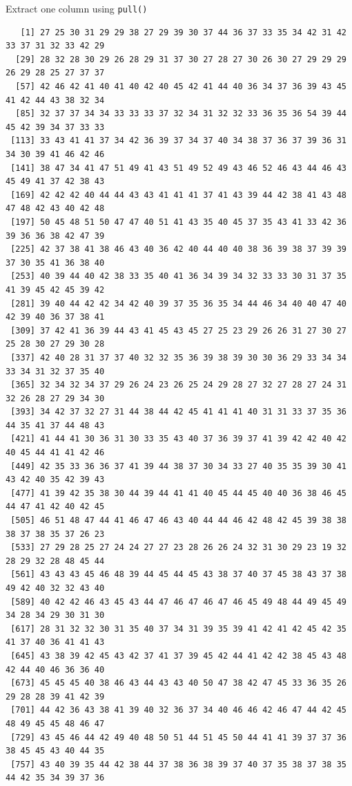 \documentclass[
  ignorenonframetext,
  aspectratio=169,
]{beamer}
\let\oldtexttt\texttt
\renewcommand{\texttt}[1]{\colorbox{gray!20}{\oldtexttt{#1}}}
\begin{document}
\begin{frame}[fragile]{Extract one column using \texttt{pull()}}
\begin{verbatim}
   [1] 27 25 30 31 29 29 38 27 29 39 30 37 44 36 37 33 35 34 42 31 42 33 37 31 32 33 42 29
  [29] 28 32 28 30 29 26 28 29 31 37 30 27 28 27 30 26 30 27 29 29 29 26 29 28 25 27 37 37
  [57] 42 46 42 41 40 41 40 42 40 45 42 41 44 40 36 34 37 36 39 43 45 41 42 44 43 38 32 34
  [85] 32 37 37 34 34 33 33 33 37 32 34 31 32 32 33 36 35 36 54 39 44 45 42 39 34 37 33 33
 [113] 33 43 41 41 37 34 42 36 39 37 34 37 40 34 38 37 36 37 39 36 31 34 30 39 41 46 42 46
 [141] 38 47 34 41 47 51 49 41 43 51 49 52 49 43 46 52 46 43 44 46 43 45 49 41 37 42 38 43
 [169] 42 42 42 40 44 44 43 43 41 41 41 37 41 43 39 44 42 38 41 43 48 47 48 42 43 40 42 48
 [197] 50 45 48 51 50 47 47 40 51 41 43 35 40 45 37 35 43 41 33 42 36 39 36 36 38 42 47 39
 [225] 42 37 38 41 38 46 43 40 36 42 40 44 40 40 38 36 39 38 37 39 39 37 30 35 41 36 38 40
 [253] 40 39 44 40 42 38 33 35 40 41 36 34 39 34 32 33 33 30 31 37 35 41 39 45 42 45 39 42
 [281] 39 40 44 42 42 34 42 40 39 37 35 36 35 34 44 46 34 40 40 47 40 42 39 40 36 37 38 41
 [309] 37 42 41 36 39 44 43 41 45 43 45 27 25 23 29 26 26 31 27 30 27 25 28 30 27 29 30 28
 [337] 42 40 28 31 37 37 40 32 32 35 36 39 38 39 30 30 36 29 33 34 34 33 34 31 32 37 35 40
 [365] 32 34 32 34 37 29 26 24 23 26 25 24 29 28 27 32 27 28 27 24 31 32 26 28 27 29 34 30
 [393] 34 42 37 32 27 31 44 38 44 42 45 41 41 41 40 31 31 33 37 35 36 44 35 41 37 44 48 43
 [421] 41 44 41 30 36 31 30 33 35 43 40 37 36 39 37 41 39 42 42 40 42 40 45 44 41 41 42 46
 [449] 42 35 33 36 36 37 41 39 44 38 37 30 34 33 27 40 35 35 39 30 41 43 42 40 35 42 39 43
 [477] 41 39 42 35 38 30 44 39 44 41 41 40 45 44 45 40 40 36 38 46 45 44 47 41 42 40 42 45
 [505] 46 51 48 47 44 41 46 47 46 43 40 44 44 46 42 48 42 45 39 38 38 38 37 38 35 37 26 23
 [533] 27 29 28 25 27 24 24 27 27 23 28 26 26 24 32 31 30 29 23 19 32 28 29 32 28 48 45 44
 [561] 43 43 43 45 46 48 39 44 45 44 45 43 38 37 40 37 45 38 43 37 38 49 42 40 32 32 43 40
 [589] 40 42 42 46 43 45 43 44 47 46 47 46 47 46 45 49 48 44 49 45 49 34 28 34 29 30 31 30
 [617] 28 31 32 32 30 31 35 40 37 34 31 39 35 39 41 42 41 42 45 42 35 41 37 40 36 41 41 43
 [645] 43 38 39 42 45 43 42 37 41 37 39 45 42 44 41 42 42 38 45 43 48 42 44 40 46 36 36 40
 [673] 45 45 45 40 38 46 43 44 43 43 40 50 47 38 42 47 45 33 36 35 26 29 28 28 39 41 42 39
 [701] 44 42 36 43 38 41 39 40 32 36 37 34 40 46 46 42 46 47 44 42 45 48 49 45 45 48 46 47
 [729] 43 45 46 44 42 49 40 48 50 51 44 51 45 50 44 41 41 39 37 37 36 38 45 45 43 40 44 35
 [757] 43 40 39 35 44 42 38 44 37 38 36 38 39 37 40 37 35 38 37 38 35 44 42 35 34 39 37 36

\end{verbatim}
\end{frame}
\end{document}
